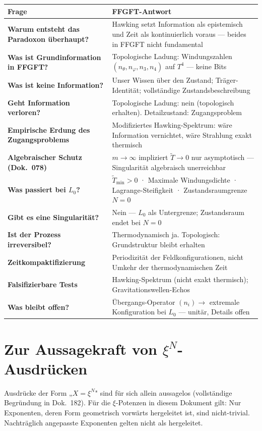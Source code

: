 \begin{longtable}{>{\bfseries}p{6cm} p{8cm}}
\toprule
Frage & FFGFT-Antwort \\
\midrule
Warum entsteht das Paradoxon überhaupt? & Hawking setzt Information als epistemisch und Zeit als kontinuierlich voraus --- beides in FFGFT nicht fundamental \\
Was ist Grundinformation in FFGFT? & Topologische Ladung: Windungszahlen $(n_\theta, n_\varphi, n_3, n_4)$ auf $T^4$ --- keine Bits \\
Was ist keine Information? & Unser Wissen über den Zustand; Träger-Identität; vollständige Zustandsbeschreibung \\
Geht Information verloren? & Topologische Ladung: nein (topologisch erhalten). Detailzustand: Zugangsproblem \\
Empirische Erdung des Zugangsproblems & Modifiziertes Hawking-Spektrum: wäre Information vernichtet, wäre Strahlung exakt thermisch \\
Algebraischer Schutz (Dok.~078) & $m \rightarrow \infty$ impliziert $\tilde{T} \rightarrow 0$ nur asymptotisch --- Singularität algebraisch unerreichbar \\
Was passiert bei $L_0$? & $\tilde{T}_\text{min} > 0$ · Maximale Windungsdichte · Lagrange-Steifigkeit · Zustandsraumgrenze $N=0$ \\
Gibt es eine Singularität? & Nein --- $L_0$ als Untergrenze; Zustandsraum endet bei $N = 0$ \\
Ist der Prozess irreversibel? & Thermodynamisch ja. Topologisch: Grundstruktur bleibt erhalten \\
Zeitkompaktifizierung & Periodizität der Feldkonfigurationen, nicht Umkehr der thermodynamischen Zeit \\
Falsifizierbare Tests & Hawking-Spektrum (nicht exakt thermisch); Gravitationswellen-Echos \\
Was bleibt offen? & Übergangs-Operator $(n_i) \rightarrow$ extremale Konfiguration bei $L_0$ --- unitär, Details offen \\
\bottomrule
\end{longtable}

\section*{Zur Aussagekraft von $\xi^N$-Ausdrücken}

Ausdrücke der Form „$X = \xi^N$" sind für sich allein aussagelos
(vollständige Begründung in Dok.~182).
Für die $\xi$-Potenzen in diesem Dokument gilt:
Nur Exponenten, deren Form geometrisch vorwärts hergeleitet ist,
sind nicht-trivial. Nachträglich angepasste Exponenten gelten nicht als hergeleitet.

